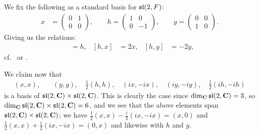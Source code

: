 We fix the following as a standard basis for $\mathfrak{sl}(2,F)$:
\begin{align}\label{eq:xhy}
  x&=
     \begin{pmatrix}
       0 & 1 \\ 0 & 0
     \end{pmatrix}, \qquad h =
                    \begin{pmatrix}
                      1 & 0 \\ 0 & -1
                    \end{pmatrix}, \qquad y =
                                   \begin{pmatrix}
                                     0 & 0 \\ 1 & 0
                                   \end{pmatrix}.
\end{align}
Giving us the relations:
\begin{align}
  [x,y]&=h, & [h,x]&=2x, & [h,y]&=-2y, \label{eq:sl2rels}
\end{align}
cf.\ \cite[35]{jantzen} or \cite[6]{humphrey}.

We claim now that
\begin{align*}
  (x,x),& \quad (y,y), \quad \tfrac{1}{2}(h,h), \quad (ix,-ix), \quad (iy,-iy), \quad \tfrac{1}{2}(ih,-ih)
\end{align*}
is a basis of $\mathfrak{sl}(2,\mathbf{C})\times \mathfrak{sl}(2,\mathbf{C})$. This is clearly the case since $\dim_{\mathbf{C}} \mathfrak{sl}(2,\mathbf{C}) = 3$, so $\dim_{\mathbf{C}} \mathfrak{sl}(2,\mathbf{C})\times \mathfrak{sl}(2,\mathbf{C}) = 6$, and we see that the above elements span $\mathfrak{sl}(2,\mathbf{C})\times \mathfrak{sl}(2,\mathbf{C})$; we have $\tfrac{1}{2}(x,x)-\tfrac{i}{2}(ix,-ix)=(x,0)$ and $\tfrac{1}{2}(x,x)+\tfrac{i}{2}(ix,-ix)=(0,x)$ and likewise with $h$ and $y$. 


